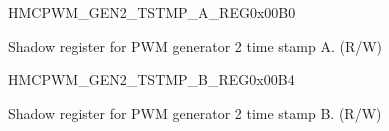 \begin{register}{H}{MCPWM\_GEN2\_TSTMP\_A\_REG}{0x00B0}\label{regdesc:MCPWMGEN2TSTMPAREG}
%
%
\regnewline%
\begin{regdesc}\begin{reglist}
\label{fielddesc:MCPWMGEN2A}\item [MCPWM\_GEN2\_A] Shadow register for PWM generator 2 time stamp A. (R/W)
\end{reglist}\end{regdesc}
\end{register}


\begin{register}{H}{MCPWM\_GEN2\_TSTMP\_B\_REG}{0x00B4}\label{regdesc:MCPWMGEN2TSTMPBREG}
%
%
\regnewline%
\begin{regdesc}\begin{reglist}
\label{fielddesc:MCPWMGEN2B}\item [MCPWM\_GEN2\_B] Shadow register for PWM generator 2 time stamp B. (R/W)
\end{reglist}\end{regdesc}
\end{register}


